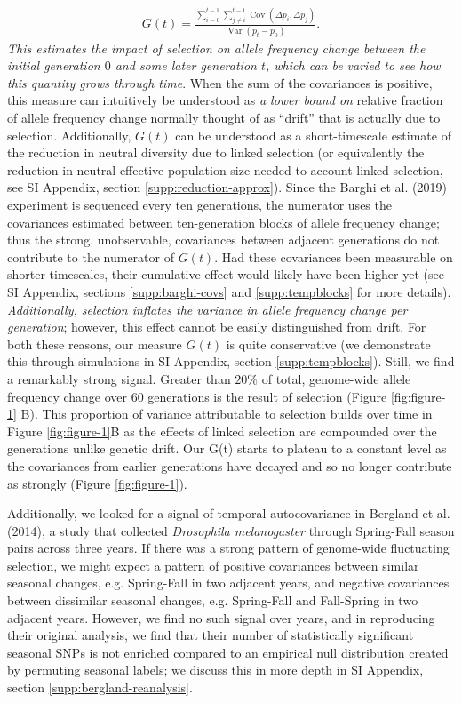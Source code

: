 \documentclass[9pt,twocolumn,twoside]{pnas-new}
\DeclareMathOperator{\var}{Var}
\DeclareMathOperator{\cov}{Cov}
\newcommand{\vb}[1]{{\it \color{red} #1}}
\begin{document}
\begin{align}
  G(t) = \frac{ \sum_{i=0}^{t-1} \sum_{j \ne i}^{t-1} \cov(\Delta p_i, \Delta p_j)}{\var(p_t - p_0)}.
\end{align}
%
\vb{This estimates the impact of selection on allele frequency change between
the initial generation $0$ and some later generation $t$, which can be varied
to see how this quantity grows through time}. When the sum of the covariances
is positive, this measure can intuitively be understood as \vb{a lower bound on
} relative fraction of allele frequency change normally thought of as ``drift''
that is actually due to selection. Additionally, $G(t)$ can be understood as a
short-timescale estimate of the reduction in neutral diversity due to linked
selection (or equivalently the reduction in neutral effective population size
needed to account linked selection, see SI Appendix, section
\ref{supp:reduction-approx}). Since the Barghi et al. (2019) experiment is
sequenced every ten generations, the numerator uses the covariances estimated
between ten-generation blocks of allele frequency change; thus the strong,
unobservable, covariances between adjacent generations do not contribute to the
numerator of $G(t)$. Had these covariances been measurable on shorter
timescales, their cumulative effect would likely have been higher yet (see SI
Appendix, sections \ref{supp:barghi-covs} and \ref{supp:tempblocks} for more
details).  \vb{Additionally, selection inflates the variance in allele
frequency change per generation}; however, this effect cannot be easily
distinguished from drift. For both these reasons, our measure $G(t)$ is quite
conservative (we demonstrate this through simulations in SI Appendix, section
\ref{supp:tempblocks}).  Still, we find a remarkably strong signal. Greater
than $20\%$ of total, genome-wide allele frequency change over 60 generations
is the result of selection (Figure \ref{fig:figure-1} B). This proportion of
variance attributable to selection builds over time in Figure
\ref{fig:figure-1}B as the effects of linked selection are compounded over the
generations unlike genetic drift. Our G(t) starts to plateau to a constant
level as the covariances from earlier generations have decayed and so no longer
contribute as strongly (Figure \ref{fig:figure-1}).

Additionally, we looked for a signal of temporal autocovariance in Bergland et
al. (2014), a study that collected \emph{Drosophila melanogaster} through
Spring-Fall season pairs across three years. If there was a strong  pattern of
genome-wide fluctuating selection, we might expect a pattern of positive
covariances between similar seasonal changes, e.g.  Spring-Fall in two adjacent
years, and negative covariances between dissimilar seasonal changes, e.g.
Spring-Fall and Fall-Spring in two adjacent years.  However, we find no such
signal over years, and in reproducing their original analysis, we find that
their number of statistically significant seasonal SNPs is not enriched
compared to an empirical null distribution created by permuting seasonal
labels; we discuss this in more depth in SI Appendix, section
\ref{supp:bergland-reanalysis}.
\end{document}
